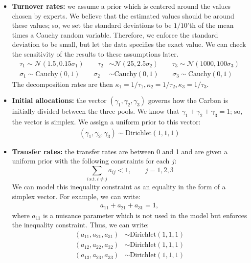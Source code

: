 \documentclass[10pt,a4paper]{article}
\begin{document}
\begin{itemize}
\item {\bf Turnover rates: } we assume a prior which is centered around the values chosen by experts. We believe that the estimated values should be around these values; so, we set the standard deviations to be $1/10$'th of the mean times a Cauchy random variable.  Therefore, we enforce the standard deviation to be small, but let the data specifies the exact value. We can check the sensitivity of the results to these assumptions later. 
\begin{align*}
\tau_1  \sim  \mathcal{N}(1.5, 0.15 \sigma_1) \qquad
\tau_2  &\sim \mathcal{N}(25, 2.5 \sigma_2) \qquad
\tau_3 \sim \mathcal{N}(1000,100 \sigma_3) \\ \sigma_1 \sim \text{Cauchy}(0,1) \qquad  \sigma_2 &\sim \text{Cauchy}(0,1) \qquad \sigma_3 \sim \text{Cauchy}(0,1)
\end{align*}
The decomposition rates are then $\kappa_1=1/\tau_1, \kappa_2=1/\tau_2, \kappa_3=1/\tau_3$.
\item {\bf Initial allocations: } the vector $(\gamma_1, \gamma_2, \gamma_3)$ governs how the Carbon is initially divided between the three pools. We know that $\gamma_1+\gamma_2+\gamma_3=1$; so, the vector is simplex. We assign a uniform prior to this vector:
\begin{align*}
(\gamma_1, \gamma_2, \gamma_3) \sim \text{Dirichlet}(1,1,1)
\end{align*}
\item {\bf Transfer rates: } the transfer rates are between 0 and 1 and are given a uniform prior with the following constraints for each $j$:
\begin{equation*}
\sum_{i \ \text{s.t.} \ i\neq j}{a_{ij}} < 1, \qquad j=1, 2, 3
\end{equation*}
We can model this inequality constraint as an equality in the form of a simplex vector. For example, we can write:
\begin{align*}
a_{11} + a_{21} + a_{31} = 1,
\end{align*}
where $a_{11}$ is a nuisance parameter which is not used in the model but enforces the inequality constraint. Thus, we can write:
\begin{align*}
(a_{11}, a_{21}, a_{31}) & \sim \text{Dirichlet}(1,1,1) \\
(a_{12}, a_{22}, a_{32}) & \sim \text{Dirichlet}(1,1,1) \\
(a_{13}, a_{23}, a_{33}) & \sim \text{Dirichlet}(1,1,1)
\end{align*} 
\end{itemize}
\end{document}
